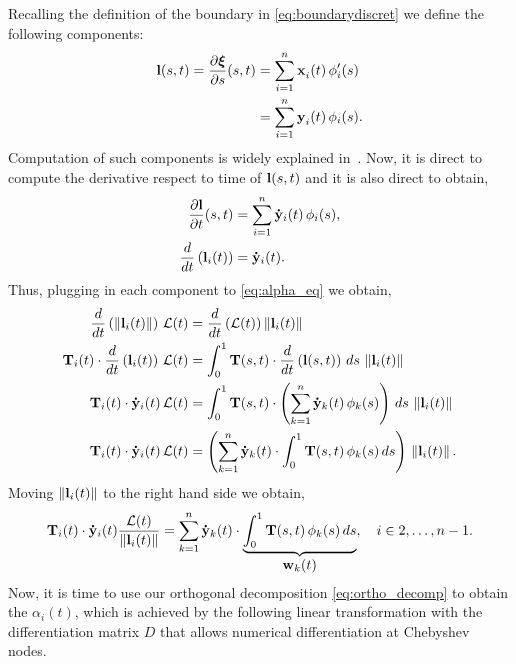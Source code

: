 Recalling the definition of the boundary in \eqref{eq:boundarydiscret} we define the following components:
\begin{align*}
    \mylvec(s,t) = \dxids(s,t) &= \sum_{i=1}^{n} \x[i](t) \,\phi_i'(s)\\
    &=  \sum_{i=1}^{n} \y[i](t) \,\phi_i(s).
\end{align*}
Computation of such components is widely explained in~\cite{bachelorthesisasazo}. Now, it is direct to compute the derivative
respect to time of $\mathbf{l}(s,t)$ and it is also
direct to obtain,
%
\begin{align*}
\dfrac{\partial \mylvec}{\partial t}(s,t) 
&= \sum_{i=1}^{n} \doty_{i}(t) \,\phi_i(s),\\
\dfrac{d}{dt}\left(\mylvec_i(t)\right)&=\doty_{i}(t).
\end{align*}
%
Thus, plugging in each component to \eqref{eq:alpha_eq} we obtain,
%
\begin{align*}
    \dfrac{d}{dt}\left(\norm{\mylvec_i(t)}\right)
    \,\mathcal{L}(t)&=
    \dfrac{d}{dt}\left(\AL(t)\right)
    \norm{\mylvec_i(t)} \\
    \T_i(t)\cdot\dfrac{d}{dt}\left(\mylvec_i(t)\right)
    \,\AL(t) &= \int_0^1 \T(s,t)\cdot \dfrac{d}{dt}\left(\mylvec(s,t)\right)\,ds\,
    \norm{\mylvec_i(t)}\\
    \T_i(t)\cdot\doty_{i}(t) \,\AL(t) &=
    \int_0^1 \T(s,t)\cdot \left(\sum_{k=1}^{n} \doty_{k}(t) \,\phi_k(s)\right)\,ds\,
    \norm{\mylvec_i(t)}\\
    \T_i(t)\cdot\doty_{i}(t) \,\AL(t) &=
    \left(\sum_{k=1}^{n} \doty_{k}(t)\cdot \int_0^1 \T(s,t)\, \phi_k(s)\,ds\right)\,
    \norm{\mylvec_i(t)}.
\end{align*}
Moving $\left\lVert\mathbf{l}_i(t)\right\rVert$ to the right hand side we obtain,
\begin{equation}
    \T_i(t)\cdot\doty_{i}(t) \dfrac{\AL(t)}{\norm{\mylvec_i(t)}} =
    \sum_{k=1}^{n} \doty_{k}(t)\cdot \underbrace{\int_0^1 \T(s,t)\, \phi_k(s)\,ds}_{\displaystyle \mathbf{w}_k(t)}, \quad i\in{2,\dots,n-1}.
    \label{eq:alpha_eq_base}
\end{equation}
%
Now, it is time to use our orthogonal
decomposition \eqref{eq:ortho_decomp} to
obtain the $\alpha_i(t)$, which is achieved
by the following linear transformation with the differentiation matrix $D$ that allows numerical differentiation at Chebyshev nodes.
